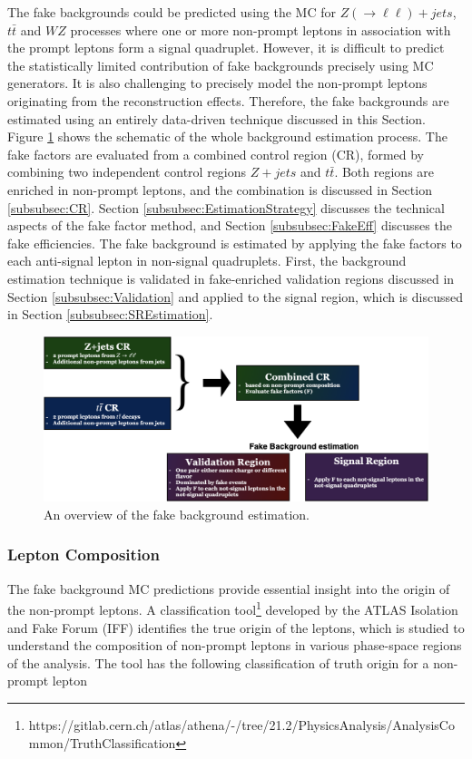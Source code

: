 The fake backgrounds could be predicted using the MC for $Z(\rightarrow \ell \ell) + jets $, $t\bar{t}$ and $WZ$ processes where one or more non-prompt leptons in association with the prompt leptons form a signal quadruplet. However, it is difficult to predict the statistically limited contribution of fake backgrounds precisely using MC generators. It is also challenging to precisely model the non-prompt leptons originating from the reconstruction effects. Therefore, the fake backgrounds are estimated using an entirely data-driven technique discussed in this Section. Figure \ref{fig:FakeBkgOverview} shows the schematic of the whole background estimation process. The fake factors are evaluated from a combined control region (CR), formed by combining two independent control regions $Z+jets$ and $t\bar{t}$. Both regions are enriched in non-prompt leptons, and the combination is discussed in Section \ref{subsubsec:CR}. Section \ref{subsubsec:EstimationStrategy} discusses the technical aspects of the fake factor method, and Section \ref{subsubsec:FakeEff} discusses the fake efficiencies. The fake background is estimated by applying the fake factors to each anti-signal lepton in non-signal quadruplets. First, the background estimation technique is validated in fake-enriched validation regions discussed in Section \ref{subsubsec:Validation} and applied to the signal region, which is discussed in Section \ref{subsubsec:SREstimation}. 

\begin{figure}[!htb]
    \centering
    \includegraphics[width=.99\linewidth, angle =0]{figures/Analysis/Background/FakeBackgroundOverview.png}  
    \caption{An overview of the fake background estimation.\label{fig:FakeBkgOverview}}
\end{figure}

\subsubsection{Lepton Composition}
\label{subsubsec:LepComp}
The fake background MC predictions provide essential insight into the origin of the non-prompt leptons. A classification tool\footnote{https://gitlab.cern.ch/atlas/athena/-/tree/21.2/PhysicsAnalysis/AnalysisCommon/TruthClassification} developed by the ATLAS Isolation and Fake Forum (IFF) identifies the true origin of the leptons, which is studied to understand the composition of non-prompt leptons in various phase-space regions of the analysis. The tool has the following classification of truth origin for a non-prompt lepton

